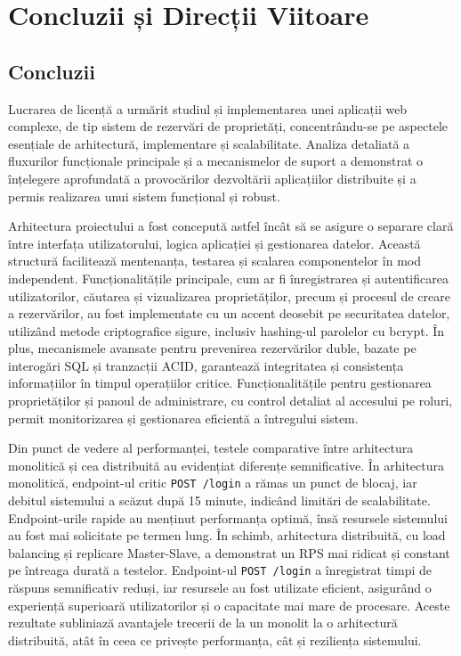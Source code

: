 \documentclass[12pt, a4paper, oneside, romanian]{teza-upb}
\begin{document}
\chapter{Concluzii și Direcții Viitoare}

\section{Concluzii}
Lucrarea de licență a urmărit studiul și implementarea unei aplicații web complexe, de tip sistem de rezervări de proprietăți, concentrându-se pe aspectele esențiale de arhitectură, implementare și scalabilitate. Analiza detaliată a fluxurilor funcționale principale și a mecanismelor de suport a demonstrat o înțelegere aprofundată a provocărilor dezvoltării aplicațiilor distribuite și a permis realizarea unui sistem funcțional și robust.

Arhitectura proiectului a fost concepută astfel încât să se asigure o separare clară între interfața utilizatorului, logica aplicației și gestionarea datelor. Această structură facilitează mentenanța, testarea și scalarea componentelor în mod independent. Funcționalitățile principale, cum ar fi înregistrarea și autentificarea utilizatorilor, căutarea și vizualizarea proprietăților, precum și procesul de creare a rezervărilor, au fost implementate cu un accent deosebit pe securitatea datelor, utilizând metode criptografice sigure, inclusiv hashing-ul parolelor cu bcrypt. În plus, mecanismele avansate pentru prevenirea rezervărilor duble, bazate pe interogări SQL și tranzacții ACID, garantează integritatea și consistența informațiilor în timpul operațiilor critice. Funcționalitățile pentru gestionarea proprietăților și panoul de administrare, cu control detaliat al accesului pe roluri, permit monitorizarea și gestionarea eficientă a întregului sistem.

Din punct de vedere al performanței, testele comparative între arhitectura monolitică și cea distribuită au evidențiat diferențe semnificative. În arhitectura monolitică, endpoint-ul critic \texttt{POST /login} a rămas un punct de blocaj, iar debitul sistemului a scăzut după 15 minute, indicând limitări de scalabilitate. Endpoint-urile rapide au menținut performanța optimă, însă resursele sistemului au fost mai solicitate pe termen lung. În schimb, arhitectura distribuită, cu load balancing și replicare Master-Slave, a demonstrat un RPS mai ridicat și constant pe întreaga durată a testelor. Endpoint-ul \texttt{POST /login} a înregistrat timpi de răspuns semnificativ reduși, iar resursele au fost utilizate eficient, asigurând o experiență superioară utilizatorilor și o capacitate mai mare de procesare. Aceste rezultate subliniază avantajele trecerii de la un monolit la o arhitectură distribuită, atât în ceea ce privește performanța, cât și reziliența sistemului.
\end{document}

